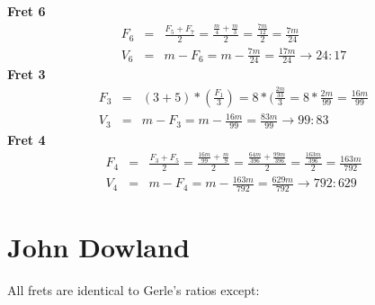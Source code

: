 \textbf{Fret 6}
\begin{eqnarray*}
    F_{6}
        &=& \frac{F_{5} + F_{7}}{2}
        = \frac{\frac{m}{4} + \frac{m}{3}}{2}
        = \frac{\frac{7m}{12}}{2}
        = \frac{7m}{24} \\
    V_{6}
        &=& m - F_{6}
        = m - \frac{7m}{24}
        = \frac{17m}{24}
        \to 24:17
\end{eqnarray*}
\textbf{Fret 3}
\begin{eqnarray*}
    F_{3}
        &=& (3 + 5) * (\frac{F_{1}}{3})
        = 8 * (\frac{\frac{2m}{33}}{3}
        = 8 * \frac{2m}{99}
        = \frac{16m}{99} \\
    V_{3}
        &=& m - F_{3}
        = m - \frac{16m}{99} = \frac{83m}{99}
        \to 99:83
\end{eqnarray*}
\textbf{Fret 4}
\begin{eqnarray*}
    F_{4}
        &=& \frac{F_{3} + F_{5}}{2}
        = \frac{\frac{16m}{99} + \frac{m}{9}}{2}
        = \frac{\frac{64m}{396} + \frac{99m}{396}}{2}
        = \frac{\frac{163m}{396}}{2}
        = \frac{163m}{792} \\
    V_{4}
        &=& m - F_{4}
        = m - \frac{163m}{792}
        = \frac{629m}{792}
        \to 792:629
\end{eqnarray*}

\section{John Dowland}
All frets are identical to Gerle's ratios except:

